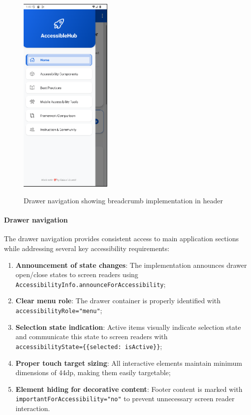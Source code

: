 \begin{figure}[ht]
    \centering
    \includegraphics[width=0.4\textwidth, alt={Drawer navigation with breadcrumb in header}]{img/drawer.png}
    \caption{Drawer navigation showing breadcrumb implementation in header}\label{fig:drawer-navigation}
\end{figure}

\paragraph{Drawer navigation}

The drawer navigation provides consistent access to main application sections while addressing several key accessibility requirements:

\begin{enumerate}
    \item \textbf{Announcement of state changes}: The implementation announces drawer open/close states to screen readers using \\ \texttt{AccessibilityInfo.announceForAccessibility};
    
    \item \textbf{Clear menu role}: The drawer container is properly identified with \\ \texttt{accessibilityRole="menu"};
    
    \item \textbf{Selection state indication}: Active items visually indicate selection state and communicate this state to screen readers with \\ \texttt{accessibilityState=\{\{selected: isActive\}\}};
    
    \item \textbf{Proper touch target sizing}: All interactive elements maintain minimum dimensions of 44dp, making them easily targetable;
    
    \item \textbf{Element hiding for decorative content}: Footer content is marked with \texttt{importantForAccessibility="no"} to prevent unnecessary screen reader interaction.
\end{enumerate}

